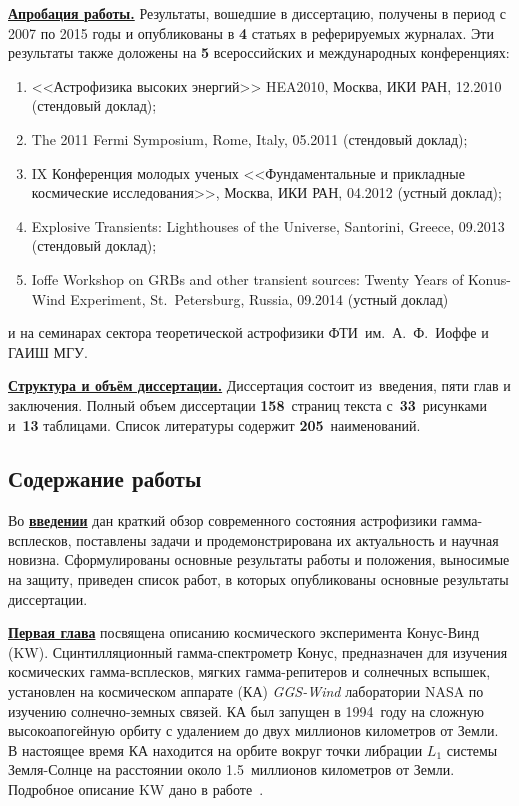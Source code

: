 \underline{\textbf{Апробация работы.}}
Результаты, вошедшие в диссертацию, получены в период с 2007 по 2015
годы и опубликованы в \textbf{4} статьях в реферируемых журналах.
Эти результаты также доложены на \textbf{5} всероссийских и международных конференциях: 
\begin{enumerate}
\item <<Астрофизика высоких энергий>> HEA2010, Москва, ИКИ РАН, 12.2010 (стендовый доклад);
\item The 2011 Fermi Symposium, Rome, Italy, 05.2011 (стендовый доклад);
\item IX Конференция молодых ученых <<Фундаментальные и прикладные космические исследования>>, 
    Москва, ИКИ РАН, 04.2012 (устный доклад);
\item Explosive Transients: Lighthouses of the Universe, Santorini, Greece, 09.2013 (стендовый доклад);
\item Ioffe Workshop on GRBs and other transient sources: Twenty Years of Konus-Wind Experiment, 
    St.~Petersburg, Russia, 09.2014 (устный доклад)
\end{enumerate}
и на семинарах сектора теоретической астрофизики ФТИ~им.~А.~Ф.~Иоффе и ГАИШ МГУ.




\underline{\textbf{Структура и объём диссертации.}} Диссертация состоит из~введения, 
пяти глав и заключения. Полный объем диссертации \textbf{158}~страниц текста 
с~\textbf{33}~рисунками и~\textbf{13} таблицами. Список литературы содержит \textbf{205}~наименований.

\subsection*{\Large Содержание работы}
Во \underline{\textbf{введении}} дан краткий обзор современного состояния астрофизики гамма-всплесков,
поставлены задачи и продемонстрирована их актуальность и научная новизна.
Сформулированы основные результаты работы и положения, выносимые на защиту, приведен
список работ, в которых опубликованы основные результаты диссертации.

\underline{\textbf{Первая глава}} посвящена описанию космического эксперимента
Конус-Винд (KW). 
Сцинтилляционный гамма-спектрометр Конус, предназначен для изучения космических 
гамма-всплесков, мягких гамма-репитеров и солнечных вспышек,
установлен на космическом аппарате (КА) \textit{GGS-Wind} лаборатории NASA по изучению 
солнечно-земных связей. КА был запущен в 1994~году на сложную высокоапогейную орбиту 
с удалением до двух миллионов километров от Земли. В настоящее время КА находится 
на орбите вокруг точки либрации $L_1$ системы Земля-Солнце на расстоянии около 
1.5~миллионов километров от Земли.
Подробное описание KW дано в работе~\citep{Aptekar_1995SSR}.

